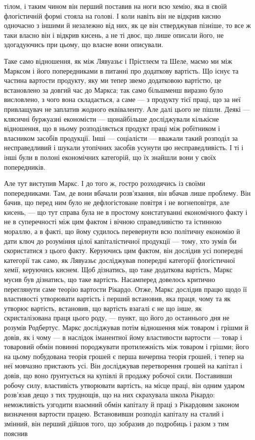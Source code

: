 \parcont{}  %
тілом, і таким чином він перший поставив на ноги всю хемію, яка в
своїй флогістичній формі стояла на голові. І коли навіть він не відкрив
кисню одночасно з іншими й незалежно від них, як це він стверджував
пізніше, то все ж таки власно він і відкрив кисень, а не ті двоє, що
лише описали його, не здогадуючись при цьому, що власне вони
описували.

Таке само відношення, як між Лявуазьє і Прістлеєм та Шеле, маємо
ми між Марксом і його попередниками в питанні про додаткову вартість.
Що існує та частина вартости продукту, яку ми тепер звемо додатковою
вартістю, це встановлено за довгий час до Маркса; так само більшменш
виразно було висловлено, з чого вона складається, а саме —
з продукту тієї праці, що за неї привлащувач не заплатив жодного еквіваленту.
Але далі цього не пішли. Деякі — клясичні буржуазні економісти —
щонайбільше досліджували кількісне відношення, що в ньому розподіляється
продукт праці між робітником і власником засобів продукції.
Інші — соціалісти — вважали такий розподіл за несправедливий і шукали
утопічних засобів усунути цю несправедливість. І ті і інші були в полоні
економічних категорій, що їх знайшли вони у своїх попередників.

Але тут виступив Маркс. І до того ж, гостро розходячись із своїми
попередниками. Там, де вони вбачали розв’язання, він вбачав лише
проблему. Він бачив, що перед ним було не дефлогістоване повітря і не
вогнеповітря, але кисень, — що тут справа була не в простому констатуванні
економічного факту і не в суперечності між цим фактом і вічною
справедливістю та істинною мораллю, а в факті, що йому судилось
перевернути всю політичну економію й дати ключ до розуміння цілої
капіталістичної продукції — тому, хто зумів би скористатися з цього
факту. Керуючись цим фактом, він дослідив усі попередні категорії так
само, як Лявуазьє досліджував попередні категорії флогістичної хемії, керуючись
киснем. Щоб дізнатись, що таке додаткова вартість, Маркс мусив
був дізнатись, що таке вартість. Насамперед довелось критично переглянути
саме теорію вартости Рікардо. Отже, Маркс дослідив працю щодо її
властивості утворювати вартість і перший встановив, яка праця, чому та
як утворює вартість, встановив, що вартість взагалі є не що інше, як
скристалізована праця цього роду, — пункт, що його до останнього дня не
розумів Родбертус. Маркс досліджував потім відношення між товаром і
грішми й довів, як і чому — в наслідок іманентної йому властивости вартости —
товар і товаровий обмін повинні породжувати протилежність між товаром
і грішми; його на цьому побудована теорія грошей є перша вичерпна
теорія грошей, і тепер на неї мовчазно пристають усі. Він досліджував
перетворення грошей на капітал і довів, що воно ґрунтується на купівлі
й продажу робочої сили. Поставивши робочу силу, властивість утворювати
вартість, на місце праці, він одним ударом розв’язав дещо з тих
труднощів, що на них скрахувала школа Рікардо: неможливість узгодити
взаємний обмін капіталу й праці з Рікардовим законом визначення вартости
працею. Встановивши розподіл капіталу на сталий і змінний, він
перший дійшов того, що зобразив до подробиць і разом з тим пояснив
\parbreak{}  %
